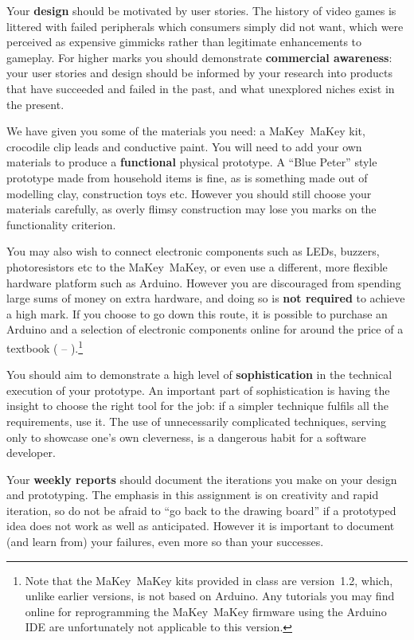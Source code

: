 \documentclass{../fal_assignment}
\begin{document}
Your \textbf{design} should be motivated by user stories.
The history of video games is littered with failed peripherals which consumers simply did not want,
which were perceived as expensive gimmicks rather than legitimate enhancements to gameplay.
For higher marks you should demonstrate \textbf{commercial awareness}:
your user stories and design should be informed by your research into products that have succeeded and failed
in the past, and what unexplored niches exist in the present.

We have given you some of the materials you need: a MaKey~MaKey kit, crocodile clip leads and conductive paint.
You will need to add your own materials to produce a \textbf{functional} physical prototype.
A ``Blue Peter'' style prototype made from household items is fine,
as is something made out of modelling clay, construction toys etc.
However you should still choose your materials carefully, as overly flimsy construction may
lose you marks on the functionality criterion.

You may also wish to connect electronic components such as LEDs, buzzers, photoresistors etc to the MaKey~MaKey,
or even use a different, more flexible hardware platform such as Arduino.
However you are discouraged from spending large sums of money on extra hardware,
and doing so is \textbf{not required} to achieve a high mark.
If you choose to go down this route,
it is possible to purchase an Arduino and a selection of electronic components online for 
around the price of a textbook ( -- ).\footnote{
    Note that the MaKey~MaKey kits provided in class are version~1.2, which, unlike earlier versions, is not based on Arduino.
    Any tutorials you may find online for reprogramming the MaKey~MaKey firmware using the Arduino IDE
    are unfortunately not applicable to this version.
}

You should aim to demonstrate a high level of \textbf{sophistication}
in the technical execution of your prototype.
An important part of sophistication is having the insight to choose the right tool for the job:
if a simpler technique fulfils all the requirements, use it.
The use of unnecessarily complicated techniques, serving only to showcase one's own cleverness,
is a dangerous habit for a software developer.

Your \textbf{weekly reports} should document the iterations you make on your design and prototyping.
The emphasis in this assignment is on creativity and rapid iteration,
so do not be afraid to ``go back to the drawing board'' if a prototyped idea does not work as well as anticipated.
However it is important to document (and learn from) your failures, even more so than your successes.
\end{document}
